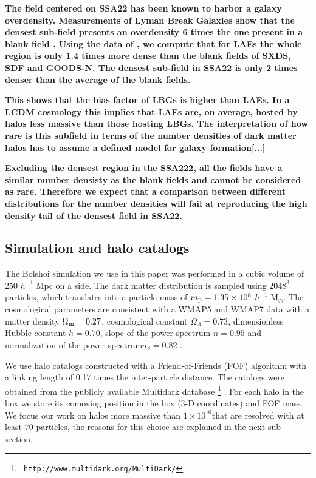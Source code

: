 \documentclass[usenatbib]{mn2e}
\newcommand{\hMsun}{{\ifmmode{h^{-1}{\rm
        {M_{\odot}}}}\else{$h^{-1}{\rm{M_{\odot}}}$}\fi}}
\begin{document}
{\bf The field centered on SSA22 has been known to harbor a 
  galaxy overdensity. Measurements of Lyman Break Galaxies show that
  the densest sub-field presents an overdensity 6 times the one present in a
  blank field \cite{XXX}. Using the data of \cite{Yamada2012}, we
  compute that for LAEs the whole region is only 1.4 times more dense than
  the blank fields of SXDS, SDF and GOODS-N. The densest sub-field
  in SSA22 is only 2 times denser than the average of the blank
  fields.}

{\bf This shows that the bias factor of LBGs is higher
  than LAEs. In a LCDM cosmology this implies that LAEs are, on average,
  hosted by halos less massive than those hosting LBGs. The
  interpretation of how rare is this subfield in terms of the number
  densities of dark matter halos has to assume a defined model for
  galaxy formation[...]} 

{\bf Excluding the densest region in the SSA222, all the fields have a
similar number densisty as the blank fields and cannot be considered
as rare. Therefore we expect that a comparison between different
distributions for the number densities will fail at reproducing the
high density tail of the densest field in SSA22.} 

\subsection{Simulation and halo catalogs}

The Bolshoi simulation \citep{Bolshoi} we use in this paper was
performed in a cubic volume of 250 $h^{-1}$ Mpc on a side. The
dark matter distribution is sampled using $2048^{3}$ particles, which
translates into a particle mass of $m_{\rm   p}=1.35\times 10^{8}$
$h^{-1}$ M$_{\odot}$.  The cosmological parameters are consistent with
a WMAP5 and WMAP7 data with a matter density $\Omega_{\rm m} = 0.27$,
cosmological constant $\Omega_{\Lambda}=0.73$, dimensionless Hubble constant
$h=0.70$, slope of the power spectrum $n=0.95$ and normalization of the
power spectrum$\sigma_{8}=0.82$ \citep{Komatsu2009,Jarosik2011}.  

We use halo catalogs constructed with a Friend-of-Friends (FOF)
algorithm with a linking length of 0.17 times the inter-particle
distance. The catalogs were obtained from the publicly available
Multidark database \footnote{{\tt
    http://www.multidark.org/MultiDark/}}
\citep{MultiDark}. For each halo in the box we store its
comoving position in the box (3-D coordinates) and FOF mass. We focus our work
on halos more massive than $1\times 10^{10}$\hMsun that are resolved
with at least $70$ particles, the reasons for this choice are
explained in the next sub-section.  
\end{document}
